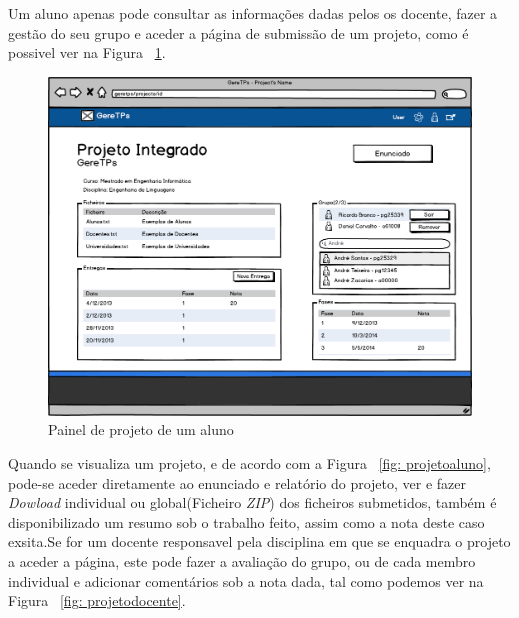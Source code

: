 Um aluno apenas pode consultar as informações dadas pelos os docente, fazer a gestão do seu grupo e aceder a página de submissão de um projeto, como é possivel ver na Figura ~\ref{fig: painelprojetoaluno}.\\

\begin{figure}[htbp] 
        \centering
        \includegraphics[width=1\textwidth]{images/prototipos/mockups/painelprojetoaluno.png}
         \caption{Painel de projeto de um aluno}
         \label{fig: painelprojetoaluno}
\end{figure}

Quando se visualiza um projeto, e de acordo com a Figura ~\ref{fig: projetoaluno}, pode-se aceder diretamente ao enunciado e relatório do projeto, ver e fazer \emph{Dowload} individual ou global(Ficheiro \emph{ZIP}) dos ficheiros submetidos, também é disponibilizado um resumo sob o trabalho feito, assim como a nota deste caso exsita.Se for um docente responsavel pela disciplina em que se enquadra o projeto a aceder a página, este pode fazer a avaliação do grupo, ou de cada membro individual e adicionar comentários sob a nota dada, tal como podemos ver na Figura ~\ref{fig: projetodocente}.\\



